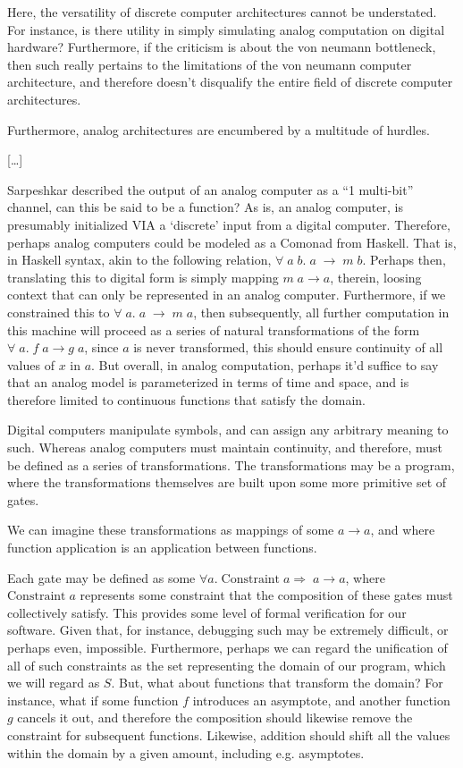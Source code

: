 Here, the versatility of discrete computer architectures cannot be understated. For instance, is there utility in simply simulating analog computation on digital hardware? Furthermore, if the criticism is about the von neumann bottleneck, then such really pertains to the limitations of the von neumann computer architecture, and therefore doesn't disqualify the entire field of discrete computer architectures. 

Furthermore, analog architectures are encumbered by a multitude of hurdles.

[\dots]

Sarpeshkar described the output of an analog computer as a ``1 multi-bit'' channel, can this be said to be a function? As is, an analog computer, is presumably initialized VIA a `discrete' input from a digital computer. Therefore, perhaps analog computers could be modeled as a Comonad from Haskell. That is, in Haskell syntax, akin to the following relation, $\forall\;a\;b.\;a\;\to\;m\;b$. Perhaps then, translating this to digital form is simply mapping $m\;a \to a$, therein, loosing context that can only be represented in an analog computer. Furthermore, if we constrained this to $\forall\;a.\;a\;\to\;m\;a$, then subsequently, all further computation in this machine will proceed as a series of natural transformations of the form $\forall\;a.\;f\;a \to g\;a$, since $a$ is never transformed, this should ensure continuity of all values of $x$ in $a$. But overall, in analog computation, perhaps it'd suffice to say that an analog model is parameterized in terms of time and space, and is therefore limited to continuous functions that satisfy the domain. 

Digital computers manipulate symbols, and can assign any arbitrary meaning to such. Whereas analog computers must maintain continuity, and therefore, must be defined as a series of transformations. The transformations may be a program, where the transformations themselves are built upon some more primitive set of gates. 

We can imagine these transformations as mappings of some $a\to{a}$, and where function application is an application between functions.

Each gate may be defined as some $\forall{a}.\;\mathrm{Constraint}\;a\Rightarrow\;a\to{a}$, where $\mathrm{Constraint}\;a$ represents some constraint that the composition of these gates must collectively satisfy. This provides some level of formal verification for our software. Given that, for instance, debugging such may be extremely difficult, or perhaps even, impossible. Furthermore, perhaps we can regard the unification of all of such constraints as the set representing the domain of our program, which we will regard as $S$. But, what about functions that transform the domain? For instance, what if some function $f$ introduces an asymptote, and another function $g$ cancels it out, and therefore the composition should likewise remove the constraint for subsequent functions. Likewise, addition should shift all the values within the domain by a given amount, including e.g. asymptotes. 

